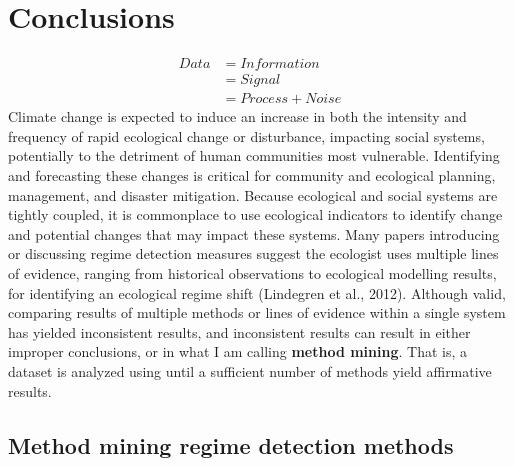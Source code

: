 \documentclass[12pt,twoside,openany]{reedthesis}
\begin{document}
\hypertarget{conclusions}{%
\chapter{Conclusions}\label{conclusions}}
\begin{equation}
\begin{split}
Data  & = Information \\
& = Signal \\
& = Process + Noise
\end{split}
\label{eq:infoTheory}
\end{equation}
Climate change is expected to induce an increase in both the intensity and frequency of rapid ecological change or disturbance, impacting social systems, potentially to the detriment of human communities most vulnerable. Identifying and forecasting these changes is critical for community and ecological planning, management, and disaster mitigation. Because ecological and social systems are tightly coupled, it is commonplace to use ecological indicators to identify change and potential changes that may impact these systems. Many papers introducing or discussing regime detection measures suggest the ecologist uses multiple lines of evidence, ranging from historical observations to ecological modelling results, for identifying an ecological regime shift (Lindegren et al., 2012). Although valid, comparing results of multiple methods or lines of evidence within a single system has yielded inconsistent results, and inconsistent results can result in either improper conclusions, or in what I am calling \textbf{method mining}. That is, a dataset is analyzed using until a sufficient number of methods yield affirmative results.

\hypertarget{method-mining-regime-detection-methods}{%
\section{Method mining regime detection methods}\label{method-mining-regime-detection-methods}}
\end{document}
